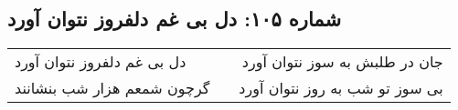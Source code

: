 \begin{center}
\section*{شماره ۱۰۵: دل بی غم دلفروز نتوان آورد}
\label{sec:105}
\begin{longtable}{l p{0.5cm} r}
دل بی غم دلفروز نتوان آورد
&&
جان در طلبش به سوز نتوان آورد
\\
گرچون شمعم هزار شب بنشانند
&&
بی سوز تو شب به روز نتوان آورد
\\
\end{longtable}
\end{center}
